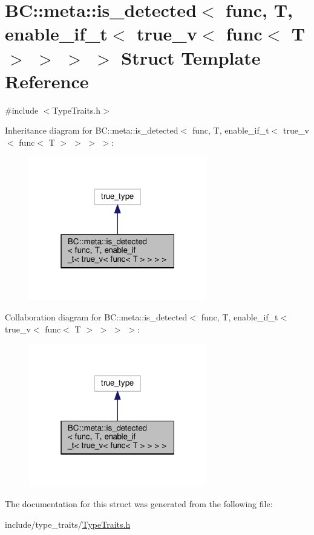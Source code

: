 \hypertarget{structBC_1_1meta_1_1is__detected_3_01func_00_01T_00_01enable__if__t_3_01true__v_3_01func_3_01T_01_4_01_4_01_4_01_4}{}\section{BC\+:\+:meta\+:\+:is\+\_\+detected$<$ func, T, enable\+\_\+if\+\_\+t$<$ true\+\_\+v$<$ func$<$ T $>$ $>$ $>$ $>$ Struct Template Reference}
\label{structBC_1_1meta_1_1is__detected_3_01func_00_01T_00_01enable__if__t_3_01true__v_3_01func_3_01T_01_4_01_4_01_4_01_4}


{\ttfamily \#include $<$Type\+Traits.\+h$>$}



Inheritance diagram for BC\+:\+:meta\+:\+:is\+\_\+detected$<$ func, T, enable\+\_\+if\+\_\+t$<$ true\+\_\+v$<$ func$<$ T $>$ $>$ $>$ $>$\+:
\nopagebreak
\begin{figure}[H]
\begin{center}
\leavevmode
\includegraphics[width=220pt]{structBC_1_1meta_1_1is__detected_3_01func_00_01T_00_01enable__if__t_3_01true__v_3_01func_3_01T_0cbb9d4b2f52469b0fb948acfda8c1249}
\end{center}
\end{figure}


Collaboration diagram for BC\+:\+:meta\+:\+:is\+\_\+detected$<$ func, T, enable\+\_\+if\+\_\+t$<$ true\+\_\+v$<$ func$<$ T $>$ $>$ $>$ $>$\+:
\nopagebreak
\begin{figure}[H]
\begin{center}
\leavevmode
\includegraphics[width=220pt]{structBC_1_1meta_1_1is__detected_3_01func_00_01T_00_01enable__if__t_3_01true__v_3_01func_3_01T_01_4_01_4_01_4_01_4__coll__graph}
\end{center}
\end{figure}


The documentation for this struct was generated from the following file\+:\begin{DoxyCompactItemize}
\item 
include/type\+\_\+traits/\hyperlink{TypeTraits_8h}{Type\+Traits.\+h}\end{DoxyCompactItemize}
